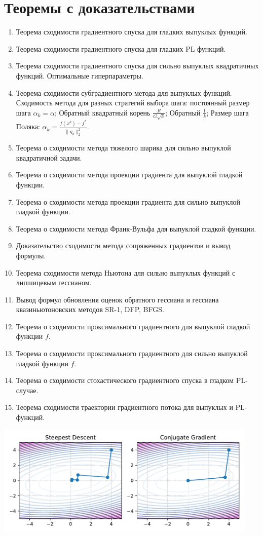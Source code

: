 \documentclass[
  letterpaper,
  DIV=11,
  numbers=noendperiod]{scrartcl}
\providecommand{\tightlist}{%
  \setlength{\itemsep}{0pt}\setlength{\parskip}{0pt}}\usepackage{longtable,booktabs,array}
\begin{document}
\section{Теоремы с
доказательствами}\label{ux442ux435ux43eux440ux435ux43cux44b-ux441-ux434ux43eux43aux430ux437ux430ux442ux435ux43bux44cux441ux442ux432ux430ux43cux438}

\begin{enumerate}
\def\labelenumi{\arabic{enumi}.}
\tightlist
\item
  Теорема сходимости градиентного спуска для гладких выпуклых функций.
\item
  Теорема сходимости градиентного спуска для гладких PL функций.
\item
  Теорема сходимости градиентного спуска для сильно выпуклых
  квадратичных функций. Оптимальные гиперпараметры.
\item
  Теорема сходимости субградиентного метода для выпуклых функций.
  Сходимость метода для разных стратегий выбора шага: постоянный размер
  шага \(\alpha_k = \alpha\); Обратный квадратный корень
  \(\frac{R}{G\sqrt{k}}\); Обратный \(\frac1k\); Размер шага Поляка:
  \(\alpha_k = \frac{f(x^k) - f^*}{\|g_k\|_2^2}\).
\item
  Теорема о сходимости метода тяжелого шарика для сильно выпуклой
  квадратичной задачи.
\item
  Теорема о сходимости метода проекции градиента для выпуклой гладкой
  функции.
\item
  Теорема о сходимости метода проекции градиента для сильно выпуклой
  гладкой функции.
\item
  Теорема о сходимости метода Франк-Вульфа для выпуклой гладкой функции.
\item
  Доказательство сходимости метода сопряженных градиентов и вывод
  формулы.
\item
  Теорема сходимости метода Ньютона для сильно выпуклых функций с
  липшицевым гессианом.
\item
  Вывод формул обновления оценок обратного гессиана и гессиана
  квазиньютоновских методов SR-1, DFP, BFGS.
\item
  Теорема о сходимости проксимального градиентного для выпуклой гладкой
  функции \(f\).
\item
  Теорема о сходимости проксимального градиентного для сильно выпуклой
  гладкой функции \(f\).
\item
  Теорема о сходимости стохастического градиентного спуска в гладком
  PL-случае.
\item
  Теорема сходимости траектории градиентного потока для выпуклых и
  PL-функций.
\end{enumerate}

\includegraphics[width=0.94\textwidth,height=\textheight]{SD_vs_CG.pdf}
\end{document}
